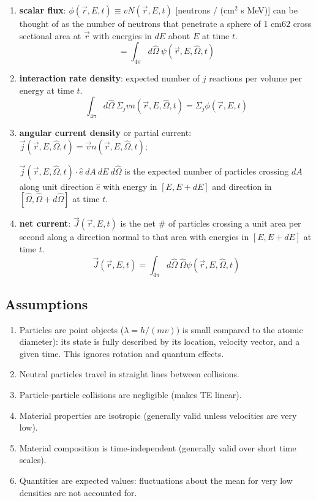 \documentclass[12pt]{article}
\newcommand{\vOmega}{\ensuremath{\hat{\Omega}}}
\begin{document}
\begin{enumerate}
\item \textbf{scalar flux}: $\phi(\vec{r},E,t) \equiv v N(\vec{r},E,t)$ [neutrons / (cm$^2$ s MeV)] can be thought of as the number of neutrons that penetrate a sphere of 1 cm$62$ cross sectional area at $\vec{r}$ with energies in $dE$ about $E$ at time $t$.
%
\[= \int_{4\pi} d\vOmega\: \psi(\vec{r}, E, \vOmega, t) \]

\item \textbf{interaction rate density}: expected number of $j$ reactions per volume per energy at time $t$.
%
\[\int_{4\pi} d\vOmega \:\Sigma_j v n(\vec{r}, E, \vOmega, t) = \Sigma_j \phi(\vec{r},E,t)\]

\item \textbf{angular current density} or partial current: $\vec{j}(\vec{r}, E, \vOmega, t) = \vec{v} n(\vec{r}, E, \vOmega, t)$; 

$\vec{j}(\vec{r}, E, \vOmega, t) \cdot \hat{e}\: dA\: dE\: d\vOmega$ is the expected number of particles crossing $dA$ along unit direction $\hat{e}$ with energy in $[E, E + dE]$ and direction in $[\vOmega, \vOmega + d\vOmega]$ at time $t$.

\item \textbf{net current}: $\vec{J}(\vec{r}, E, t) $ is the net \# of particles crossing a unit area per second along a direction normal to that area with energies in $[E, E + dE]$ at time $t$.
\[\vec{J}(\vec{r}, E, t) = \int_{4\pi} d\vOmega\: \vOmega \psi(\vec{r}, E, \vOmega, t)\]

\end{enumerate}

\subsection*{Assumptions}
\begin{enumerate}
\item Particles are point objects ($\lambda = h/(mv))$ is small compared to the atomic diameter): its state is fully described by its location, velocity vector, and a given time. This ignores rotation and quantum effects.

\item Neutral particles travel in straight lines between collisions.

\item Particle-particle collisions are negligible (makes TE linear).

\item Material properties are isotropic (generally valid unless velocities are very low).

\item Material composition is time-independent (generally valid over short time scales).

\item Quantities are expected values: fluctuations about the mean for very low densities are not accounted for.
\end{enumerate}
\end{document}
